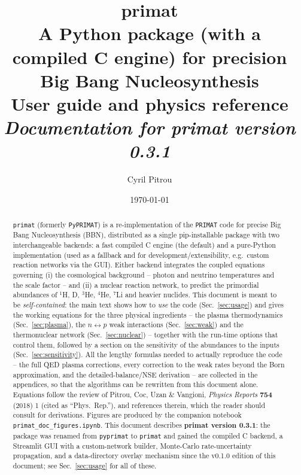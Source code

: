 \documentclass[11pt,a4paper]{article}
\title{\textbf{primat}\\[2pt]
       \large A Python package (with a compiled C engine) for precision Big
       Bang Nucleosynthesis\\[6pt]
       \normalsize User guide and physics reference\\[4pt]
       \normalsize\textit{Documentation for primat version 0.3.1}}
\author{Cyril Pitrou}
\date{\today}
\newcommand{\code}[1]{\texttt{#1}}
\newcommand{\PR}{Phys.\ Rep.}
\begin{document}
\maketitle

\begin{abstract}
\noindent
\code{primat} (formerly \code{PyPRIMAT}) is a re-implementation of the
\code{PRIMAT} code for precise Big Bang Nucleosynthesis (BBN), distributed as
a single pip-installable package with two interchangeable backends: a fast
compiled C engine (the default) and a pure-Python implementation (used as a
fallback and for development/extensibility, e.g.\ custom reaction networks
via the GUI). Either backend integrates the coupled equations governing
(i) the cosmological background -- photon and neutrino temperatures and the
scale factor -- and (ii) a nuclear reaction network, to predict the primordial
abundances of $^{1}$H, D, $^{3}$He, $^{4}$He, $^{7}$Li and heavier nuclides.
This document is meant to be \emph{self-contained}: the main text shows how to
\emph{use} the code (Sec.~\ref{sec:usage}) and gives the working equations for
the three physical ingredients -- the plasma thermodynamics
(Sec.~\ref{sec:plasma}), the $n\leftrightarrow p$ weak interactions
(Sec.~\ref{sec:weak}) and the thermonuclear network (Sec.~\ref{sec:nuclear}) --
together with the run-time options that control them, followed by a section on
the sensitivity of the abundances to the inputs (Sec.~\ref{sec:sensitivity}).
All the lengthy formulas needed to actually reproduce the code -- the full QED
plasma corrections, every correction to the weak rates beyond the Born
approximation, and the detailed-balance/NSE derivation -- are collected in the
appendices, so that the algorithms can be rewritten from this document alone.
Equations follow the review of Pitrou, Coc, Uzan \& Vangioni,
\emph{Physics Reports} \textbf{754} (2018) 1 \cite{PhysRep2018} (cited as
``\PR''), and references therein, which the reader should consult for
derivations.  Figures are produced by the companion notebook
\code{primat\_doc\_figures.ipynb}. This document describes \textbf{primat
version 0.3.1}: the package was renamed from \code{pyprimat} to \code{primat}
and gained the compiled C backend, a Streamlit GUI with a custom-network
builder, Monte-Carlo rate-uncertainty propagation, and a data-directory
overlay mechanism since the v0.1.0 edition of this document; see
Sec.~\ref{sec:usage} for all of these.
\end{abstract}

\tableofcontents
\end{document}
